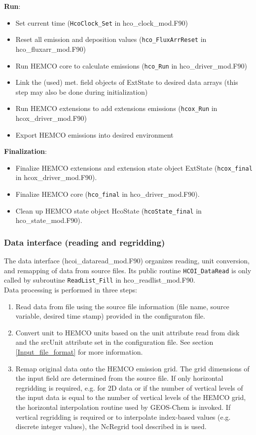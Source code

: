 \documentclass[12pt,a4paper]{article} %
\begin{document}
\textbf{Run}:
\begin{itemize}
\item Set current time (\texttt{HcoClock\_Set} in hco\_clock\_mod.F90)
\item Reset all emission and deposition values (\texttt{hco\_FluxArrReset} in hco\_fluxarr\_mod.F90)
\item Run HEMCO core to calculate emissions (\texttt{hco\_Run} in hco\_driver\_mod.F90)
\item Link the (used) met. field objects of ExtState to desired data arrays (this step may also be done during initialization)
\item Run HEMCO extensions to add extensions emissions (\texttt{hcox\_Run} in hcox\_driver\_mod.F90)
\item Export HEMCO emissions into desired environment
\end{itemize}

\textbf{Finalization}:
\begin{itemize}
\item Finalize HEMCO extensions and extension state object ExtState (\texttt{hcox\_final} in hcox\_driver\_mod.F90).
\item Finalize HEMCO core (\texttt{hco\_final} in hco\_driver\_mod.F90).
\item Clean up HEMCO state object HcoState (\texttt{hcoState\_final} in hco\_state\_mod.F90).
\end{itemize}

\subsubsection{Data interface (reading and regridding)}
The data interface (hcoi\_dataread\_mod.F90) organizes reading, unit conversion, and remapping of data from source files. Its public routine \texttt{HCOI\_DataRead} is only called by subroutine \texttt{ReadList\_Fill} in hco\_readlist\_mod.F90.\\
Data processing is performed in three steps:
\begin{enumerate}
\item Read data from file using the source file information (file name, source variable, desired time stamp) provided in the configuraton file.
\item Convert unit to HEMCO units based on the unit attribute read from disk and the srcUnit attribute set in the configuration file. See section \ref{Input_file_format} for more information.
\item Remap original data onto the HEMCO emission grid. The grid dimensions of the input field are determined from the source file. If only horizontal regridding is required, e.g. for 2D data or if the number of vertical levels of the input data is equal to the number of vertical levels of the HEMCO grid, the horizontal interpolation routine used by GEOS-Chem is invoked. If vertical regridding is required or to interpolate index-based values (e.g. discrete integer values), the NcRegrid tool described in \cite{Joeckel_ACP_2006} is used.
\end{enumerate}
\end{document}
